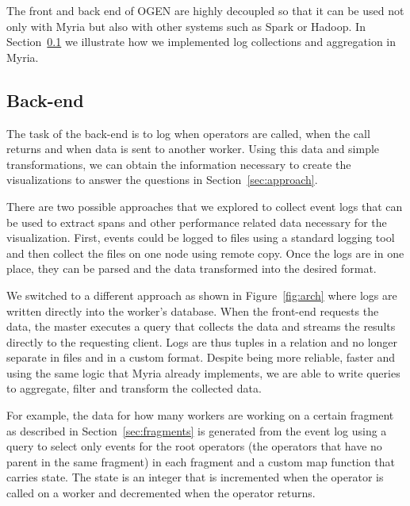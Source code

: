 \documentclass{chi2009}
\newcommand*{\system}{OGEN\xspace}
\begin{document}
The front and back end of \system are highly decoupled so that it can be used not only with Myria but also with other systems such as Spark or Hadoop. In Section~\ref{sec:back} we illustrate how we implemented log collections and aggregation in Myria.

\subsection{Back-end}
\label{sec:back}

The task of the back-end is to log when operators are called, when the call returns and when data is sent to another worker. Using this data and simple transformations, we can obtain the information necessary to create the visualizations to answer the questions in Section~\ref{sec:approach}.

There are two possible approaches that we explored to collect event logs that can be used to extract spans and other performance related data necessary for the visualization. First, events could be logged to files using a standard logging tool and then collect the files on one node using remote copy. Once the logs are in one place, they can be parsed and the data transformed into the desired format.

We switched to a different approach as shown in Figure~\ref{fig:arch} where logs are written directly into the worker's database. When the front-end requests the data, the master executes a query that collects the data and streams the results directly to the requesting client. Logs are thus tuples in a relation and no longer separate in files and in a custom format. Despite being more reliable, faster and using the same logic that Myria already implements, we are able to write queries to aggregate, filter and transform the collected data.

For example, the data for how many workers are working on a certain fragment as described in Section~\ref{sec:fragments} is generated from the event log using a query to select only events for the root operators (the operators that have no parent in the same fragment) in each fragment and a custom map function that carries state. The state is an integer that is incremented when the operator is called on a worker and decremented when the operator returns.
\end{document}
